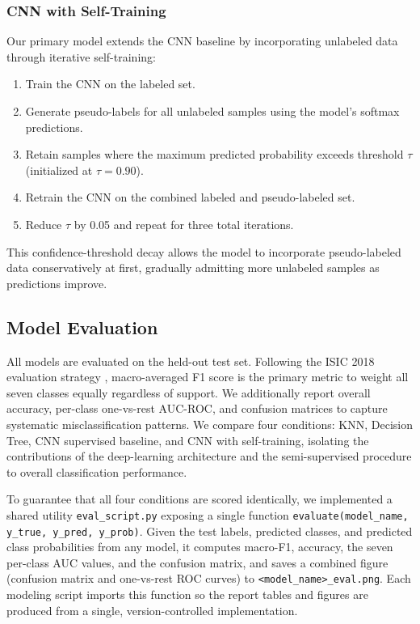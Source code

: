 \documentclass[conference]{IEEEtran}
\begin{document}
\subsubsection{CNN with Self-Training}
Our primary model extends the CNN baseline by incorporating
unlabeled data through iterative self-training:
\begin{enumerate}
    \item Train the CNN on the labeled set.
    \item Generate pseudo-labels for all unlabeled samples using
    the model's softmax predictions.
    \item Retain samples where the maximum predicted probability
    exceeds threshold $\tau$ (initialized at $\tau = 0.90$).
    \item Retrain the CNN on the combined labeled and pseudo-labeled set.
    \item Reduce $\tau$ by 0.05 and repeat for three total iterations.
\end{enumerate}
This confidence-threshold decay allows the model to incorporate
pseudo-labeled data conservatively at first, gradually admitting
more unlabeled samples as predictions improve.

\subsection{Model Evaluation}
All models are evaluated on the held-out test set. Following the
ISIC 2018 evaluation strategy \cite{codella2019}, macro-averaged
F1 score is the primary metric to weight all seven classes equally
regardless of support. We additionally report overall accuracy,
per-class one-vs-rest AUC-ROC, and confusion matrices to capture
systematic misclassification patterns. We compare four conditions:
KNN, Decision Tree, CNN supervised baseline, and CNN with
self-training, isolating the contributions of the deep-learning
architecture and the semi-supervised procedure to overall
classification performance.

To guarantee that all four conditions are scored identically, we
implemented a shared utility \texttt{eval\_script.py} exposing a
single function \texttt{evaluate(model\_name, y\_true, y\_pred, y\_prob)}.
Given the test labels, predicted classes, and predicted class
probabilities from any model, it computes macro-F1, accuracy, the
seven per-class AUC values, and the confusion matrix, and saves a
combined figure (confusion matrix and one-vs-rest ROC curves) to
\texttt{<model\_name>\_eval.png}. Each modeling script imports this
function so the report tables and figures are produced from a
single, version-controlled implementation.
\end{document}
